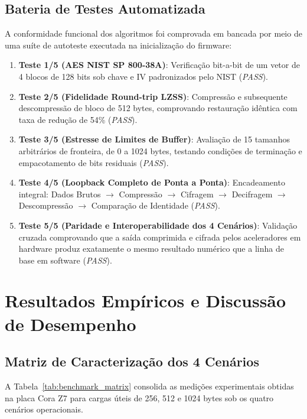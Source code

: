 \documentclass[11pt,a4paper]{article}
\begin{document}
\subsection{Bateria de Testes Automatizada}
A conformidade funcional dos algoritmos foi comprovada em bancada por meio de uma suíte de autoteste executada na inicialização do firmware:
\begin{enumerate}
  \item \textbf{Teste 1/5 (AES NIST SP 800-38A)}: Verificação bit-a-bit de um vetor de 4 blocos de 128 bits sob chave e IV padronizados pelo NIST (\textit{PASS}).
  \item \textbf{Teste 2/5 (Fidelidade Round-trip LZSS)}: Compressão e subsequente descompressão de bloco de 512 bytes, comprovando restauração idêntica com taxa de redução de 54\% (\textit{PASS}).
  \item \textbf{Teste 3/5 (Estresse de Limites de Buffer)}: Avaliação de 15 tamanhos arbitrários de fronteira, de 0 a 1024 bytes, testando condições de terminação e empacotamento de bits residuais (\textit{PASS}).
  \item \textbf{Teste 4/5 (Loopback Completo de Ponta a Ponta)}: Encadeamento integral: Dados Brutos $\rightarrow$ Compressão $\rightarrow$ Cifragem $\rightarrow$ Decifragem $\rightarrow$ Descompressão $\rightarrow$ Comparação de Identidade (\textit{PASS}).
  \item \textbf{Teste 5/5 (Paridade e Interoperabilidade dos 4 Cenários)}: Validação cruzada comprovando que a saída comprimida e cifrada pelos aceleradores em hardware produz exatamente o mesmo resultado numérico que a linha de base em software (\textit{PASS}).
\end{enumerate}

\section{Resultados Empíricos e Discussão de Desempenho}

\subsection{Matriz de Caracterização dos 4 Cenários}
A Tabela~\ref{tab:benchmark_matrix} consolida as medições experimentais obtidas na placa Cora Z7 para cargas úteis de 256, 512 e 1024 bytes sob os quatro cenários operacionais.
\end{document}
